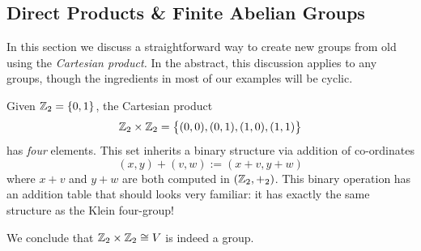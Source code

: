 \begin{exercises}
\begin{enumerate}
	
	\end{enumerate}
\end{exercises}

\clearpage

\subsection{Direct Products \& Finite Abelian Groups}\label{sec:direct}


In this section we discuss a straightforward way to create new groups from old using the \emph{Cartesian product.} In the abstract, this discussion applies to any groups, though the ingredients in most of our examples will be cyclic.

\begin{example}{}{}
	Given $\mathbb{Z}_2=\{0,1\}$, the Cartesian product
	\[
		\mathbb{Z}_2\times \mathbb{Z}_2=\bigl\{(0,0),(0,1),(1,0),(1,1)\bigr\}
	\]
	has \emph{four} elements. This set inherits a binary structure via addition of co-ordinates
	\[
		(x,y)+(v,w):=(x+v,y+w)
	\]
	where $x+v$ and $y+w$ are both computed in $(\mathbb{Z}_2,+_2)$. This binary operation has an addition table that should looks very familiar: it has exactly the same structure as the Klein four-group!
	\begin{quote}
		\qquad\scalebox{1.5}{$\leftrightsquigarrow$}\qquad
	\end{quote}
	We conclude that $\mathbb{Z}_2\times\mathbb{Z}_2\cong V$ is indeed a group.
\end{example}


